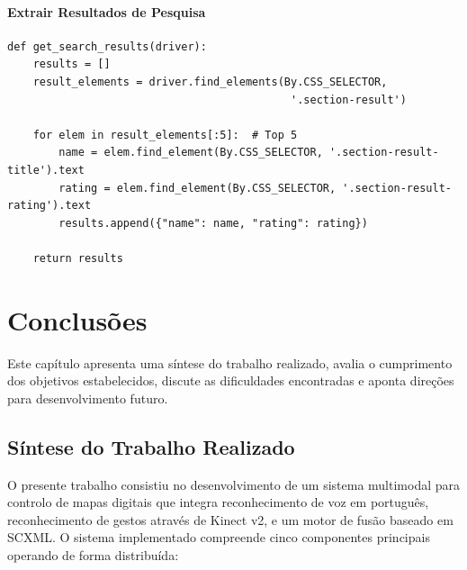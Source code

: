\subsubsection{Extrair Resultados de Pesquisa}

\begin{verbatim}
def get_search_results(driver):
    results = []
    result_elements = driver.find_elements(By.CSS_SELECTOR,
                                            '.section-result')

    for elem in result_elements[:5]:  # Top 5
        name = elem.find_element(By.CSS_SELECTOR, '.section-result-title').text
        rating = elem.find_element(By.CSS_SELECTOR, '.section-result-rating').text
        results.append({"name": name, "rating": rating})

    return results
\end{verbatim}



\chapter{Conclusões}

Este capítulo apresenta uma síntese do trabalho realizado, avalia o cumprimento dos objetivos estabelecidos, discute as dificuldades encontradas e aponta direções para desenvolvimento futuro.

\section{Síntese do Trabalho Realizado}

O presente trabalho consistiu no desenvolvimento de um sistema multimodal para controlo de mapas digitais que integra reconhecimento de voz em português, reconhecimento de gestos através de Kinect v2, e um motor de fusão baseado em SCXML. O sistema implementado compreende cinco componentes principais operando de forma distribuída:

